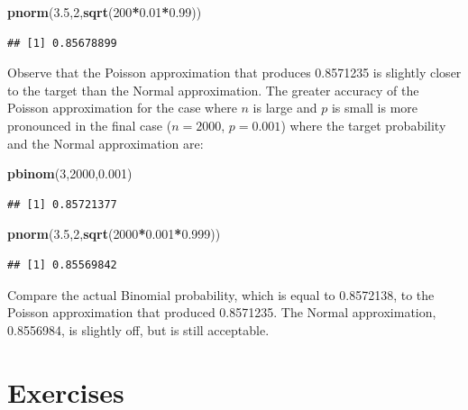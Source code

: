 \documentclass[]{krantz}
\makeatletter
\newenvironment{Shaded}{\begin{snugshade}}{\end{snugshade}}
\newcommand{\KeywordTok}[1]{\textcolor[rgb]{0.13,0.29,0.53}{\textbf{#1}}}
\newcommand{\DecValTok}[1]{\textcolor[rgb]{0.00,0.00,0.81}{#1}}
\newcommand{\FloatTok}[1]{\textcolor[rgb]{0.00,0.00,0.81}{#1}}
\newcommand{\OperatorTok}[1]{\textcolor[rgb]{0.81,0.36,0.00}{\textbf{#1}}}
\newcommand{\NormalTok}[1]{#1}
\newenvironment{kframe}{%
\medskip{}
\setlength{\fboxsep}{.8em}
 \def\at@end@of@kframe{}%
 \ifinner\ifhmode%
  \def\at@end@of@kframe{\end{minipage}}%
  \begin{minipage}{\columnwidth}%
 \fi\fi%
 \def\FrameCommand##1{\hskip\@totalleftmargin \hskip-\fboxsep
 \colorbox{shadecolor}{##1}\hskip-\fboxsep
     \hskip-\linewidth \hskip-\@totalleftmargin \hskip\columnwidth}%
 \MakeFramed {\advance\hsize-\width
   \@totalleftmargin\z@ \linewidth\hsize
   \@setminipage}}%
 {\par\unskip\endMakeFramed%
 \at@end@of@kframe}
\renewenvironment{Shaded}{\begin{kframe}}{\end{kframe}}
\theoremstyle{definition}
\theoremstyle{definition}
\theoremstyle{definition}
\theoremstyle{remark}
\makeatother
\begin{document}
\begin{Shaded}
\begin{Highlighting}[]
\KeywordTok{pnorm}\NormalTok{(}\FloatTok{3.5}\NormalTok{,}\DecValTok{2}\NormalTok{,}\KeywordTok{sqrt}\NormalTok{(}\DecValTok{200}\OperatorTok{*}\FloatTok{0.01}\OperatorTok{*}\FloatTok{0.99}\NormalTok{))}
\end{Highlighting}
\end{Shaded}

\begin{verbatim}
## [1] 0.85678899
\end{verbatim}

Observe that the Poisson approximation that produces 0.8571235 is
slightly closer to the target than the Normal approximation. The greater
accuracy of the Poisson approximation for the case where \(n\) is large
and \(p\) is small is more pronounced in the final case (\(n=2000\),
\(p=0.001\)) where the target probability and the Normal approximation
are:

\begin{Shaded}
\begin{Highlighting}[]
\KeywordTok{pbinom}\NormalTok{(}\DecValTok{3}\NormalTok{,}\DecValTok{2000}\NormalTok{,}\FloatTok{0.001}\NormalTok{)}
\end{Highlighting}
\end{Shaded}

\begin{verbatim}
## [1] 0.85721377
\end{verbatim}

\begin{Shaded}
\begin{Highlighting}[]
\KeywordTok{pnorm}\NormalTok{(}\FloatTok{3.5}\NormalTok{,}\DecValTok{2}\NormalTok{,}\KeywordTok{sqrt}\NormalTok{(}\DecValTok{2000}\OperatorTok{*}\FloatTok{0.001}\OperatorTok{*}\FloatTok{0.999}\NormalTok{))}
\end{Highlighting}
\end{Shaded}

\begin{verbatim}
## [1] 0.85569842
\end{verbatim}

Compare the actual Binomial probability, which is equal to 0.8572138, to
the Poisson approximation that produced 0.8571235. The Normal
approximation, 0.8556984, is slightly off, but is still acceptable.

\section{Exercises}\label{Normal4}
\end{document}
